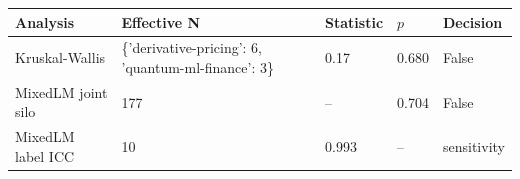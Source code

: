 \begin{tabular}{lllll}
\toprule
Analysis & Effective N & Statistic & $p$ & Decision \\
\midrule
Kruskal-Wallis & \{'derivative-pricing': 6, 'quantum-ml-finance': 3\} & 0.17 & 0.680 & False \\
MixedLM joint silo & 177 & -- & 0.704 & False \\
MixedLM label ICC & 10 & 0.993 & -- & sensitivity \\
\bottomrule
\end{tabular}
